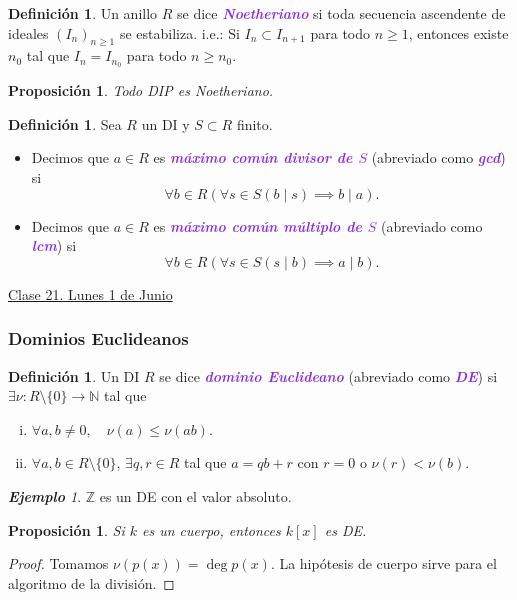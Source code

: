 \documentclass{article}
\newtheorem{proposition}[theorem]{Proposición}
\theoremstyle{definition}
\newtheorem{definition}[theorem]{Definición}
\theoremstyle{remark}
\newtheorem{example}[theorem]{\textbf{Ejemplo}}
\numberwithin{equation}{section}
\newcommand{\N}{\mathbb{N}}
\newcommand{\Z}{\mathbb{Z}}
\newcommand{\wea}[1]{\textcolor{BlueViolet}{\textbf{\emph{#1}}}}
\newcommand{\fecha}[1]{\begin{flushright} \underline{#1} \end{flushright}}
\begin{document}
\begin{definition}
  Un anillo $R$ se dice \wea{Noetheriano} si toda secuencia ascendente de ideales $(I_n)_{n \geq 1}$ se estabiliza. i.e.: Si $I_n \subset I_{n+1}$ para todo $n \geq 1$, entonces existe $n_0$ tal que $I_n = I_{n_0}$ para todo $n \geq n_0$.
\end{definition}

\begin{proposition}
  Todo DIP es Noetheriano.
\end{proposition}

\begin{definition}
  Sea $R$ un DI y $S \subset R$ finito.
  \begin{itemize}
    \item Decimos que $a \in R$ es \wea{máximo común divisor de $S$} (abreviado como \wea{gcd}) si
    \[ \forall b \in R (\forall s \in S (b \mid s) \implies b \mid a). \]
    \item Decimos que $a \in R$ es \wea{máximo común múltiplo de $S$} (abreviado como \wea{lcm}) si 
    \[ \forall b \in R (\forall s \in S(s \mid b) \implies a \mid b). \]
  \end{itemize}
\end{definition}

\newpage
\fecha{Clase 21. Lunes 1 de Junio}
\subsubsection{Dominios Euclideanos}

\begin{definition}
  Un DI $R$ se dice \wea{dominio Euclideano} (abreviado como \wea{DE}) si $\exists \nu \colon R \setminus \{0\} \to \N$ tal que 
  \begin{enumerate}[(i)]
    \item $\forall a,b \neq 0, \quad \nu(a) \leq \nu(ab)$.
    \item $\forall a,b \in R \setminus \{0\}$, $\exists q,r \in R$ tal que $a = qb+r$ con $r = 0$ o $\nu(r) < \nu(b)$.
  \end{enumerate}
\end{definition}

\begin{example}
  $\Z$ es un DE con el valor absoluto.
\end{example}

\begin{proposition}
  Si $k$ es un cuerpo, entonces $k[x]$ es DE.
\end{proposition}
\begin{proof}
  Tomamos $\nu(p(x)) = \deg{p(x)}$. La hipótesis de cuerpo sirve para el algoritmo de la división.
\end{proof}
\end{document}
